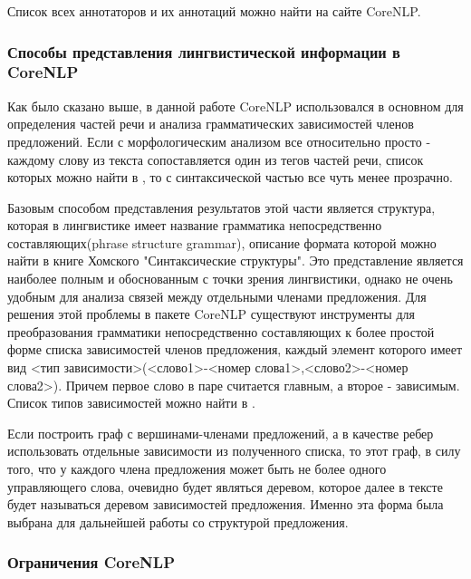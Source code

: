 Список всех аннотаторов и их аннотаций можно найти на сайте CoreNLP\cite{corenlp}.

\subsubsection{Способы представления лингвистической информации в CoreNLP}

Как было сказано выше, в данной работе CoreNLP использовался в основном для 
определения частей речи и анализа грамматических зависимостей
членов предложений.
Если с морфологическим анализом все относительно просто - каждому слову
из текста сопоставляется один из тегов частей речи, список которых можно найти в \cite{treebank},
то с синтаксической частью все чуть менее прозрачно.

Базовым способом представления результатов этой части является структура,
которая в лингвистике имеет название грамматика непосредственно составляющих(phrase structure grammar), 
описание формата которой можно найти в книге Хомского "Синтаксические структуры"\cite{homsky}.
Это представление является наиболее полным и обоснованным с точки зрения лингвистики, 
однако не очень удобным для анализа связей между отдельными членами предложения.
Для решения этой проблемы в пакете CoreNLP существуют инструменты для 
преобразования грамматики непосредственно составляющих к более простой форме
списка зависимостей членов предложения, каждый элемент которого имеет вид 
<тип зависимости>(<слово1>-<номер слова1>,<слово2>-<номер слова2>).
Причем первое слово в паре считается главным, а второе - зависимым.
Список типов зависимостей можно найти в \cite{dependencies}.

Если построить граф с вершинами-членами предложений, а в качестве ребер использовать 
отдельные зависимости из полученного списка, то этот граф, в силу того, что у каждого члена
предложения может быть не более одного управляющего слова, очевидно будет
являться деревом, которое далее в тексте будет называться деревом зависимостей предложения.
Именно эта форма была выбрана для дальнейшей работы со структурой
предложения.


\subsubsection{Ограничения CoreNLP}

